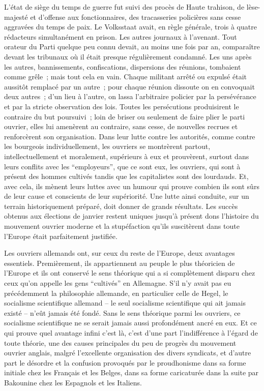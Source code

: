 \documentclass[french,twoside]{book} %
\begin{document}
L’état de siège du temps de guerre fut suivi des procès de Haute trahison, de lèse-majesté et d’offense aux fonctionnaires, des tracasseries policières sans cesse aggravées du temps de paix. Le Volksstaat avait, en règle générale, trois à quatre rédacteurs simultanément en prison. Les autres journaux à l’avenant. Tout orateur du Parti quelque peu connu devait, au moins une fois par an, comparaître devant les tribunaux où il était presque régulièrement condamné. Les uns après les autres, bannissements, confiscations, dispersions des réunions, tombaient comme grêle ; mais tout cela en vain. Chaque militant arrêté ou expulsé était aussitôt remplacé par un autre ; pour chaque réunion dissoute on en convoquait deux autres ; d’un lieu à l’autre, on lassa l’arbitraire policier par la persévérance et par la stricte observation des lois. Toutes les persécutions produisirent le contraire du but poursuivi ; loin de briser ou seulement de faire plier le parti ouvrier, elles lui amenèrent au contraire, sans cesse, de nouvelles recrues et renforcèrent son organisation. Dans leur lutte contre les autorités, comme contre les bourgeois individuellement, les ouvriers se montrèrent partout, intellectuellement et moralement, supérieurs à eux et prouvèrent, surtout dans leurs conflits avec les “employeurs”, que ce sont eux, les ouvriers, qui sont à présent des hommes cultivés tandis que les capitalistes sont des lourdauds. Et, avec cela, ils mènent leurs luttes avec un humour qui prouve combien ils sont sûrs de leur cause et conscients de leur supériorité. Une lutte ainsi conduite, sur un terrain historiquement préparé, doit donner de grands résultats. Les succès obtenus aux élections de janvier restent uniques jusqu’à présent dons l’histoire du mouvement ouvrier moderne et la stupéfaction qu’ils suscitèrent dans toute l’Europe était parfaitement justifiée.\par
Les ouvriers allemands ont, sur ceux du reste de l’Europe, deux avantages essentiels. Premièrement, ils appartiennent au peuple le plus théoricien de l’Europe et ils ont conservé le sens théorique qui a si complètement disparu chez ceux qu’on appelle les gens “cultivés” en Allemagne. S’il n’y avait pas eu précédemment la philosophie allemande, en particulier celle de Hegel, le socialisme scientifique allemand – le seul socialisme scientifique qui ait jamais existé – n’eût jamais été fondé. Sans le sens théorique parmi les ouvriers, ce socialisme scientifique ne se serait jamais aussi profondément ancré en eux. Et ce qui prouve quel avantage infini c’est là, c’est d’une part l’indifférence à l’égard de toute théorie, une des causes principales du peu de progrès du mouvement ouvrier anglais, malgré l’excellente organisation des divers syndicats, et d’autre part le désordre et la confusion provoqués par le proudhonisme dans sa forme initiale chez les Français et les Belges, dans sa forme caricaturée dans la suite par Bakounine chez les Espagnols et les Italiens.\par
\end{document}
